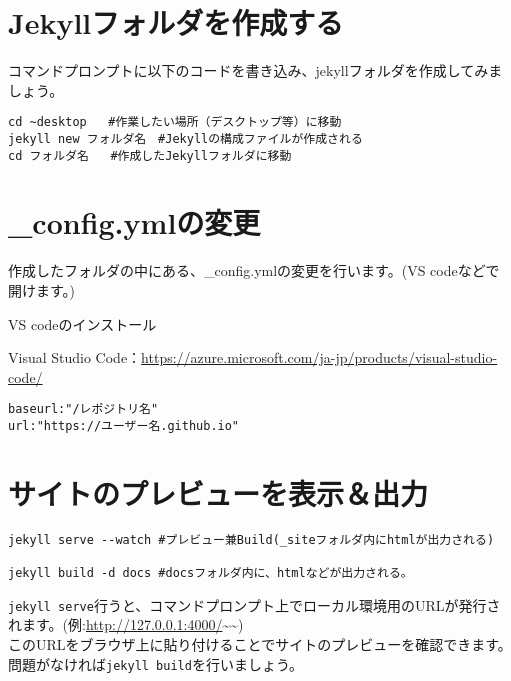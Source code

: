 \documentclass[
]{book}
\begin{document}
\hypertarget{jekyllux30d5ux30a9ux30ebux30c0ux3092ux4f5cux6210ux3059ux308b}{%
\section{Jekyllフォルダを作成する}\label{jekyllux30d5ux30a9ux30ebux30c0ux3092ux4f5cux6210ux3059ux308b}}

コマンドプロンプトに以下のコードを書き込み、jekyllフォルダを作成してみましょう。

\begin{verbatim}
cd ~desktop   #作業したい場所（デスクトップ等）に移動
jekyll new フォルダ名　#Jekyllの構成ファイルが作成される
cd フォルダ名   #作成したJekyllフォルダに移動
\end{verbatim}

\hypertarget{config.ymlux306eux5909ux66f4}{%
\section{\_config.ymlの変更}\label{config.ymlux306eux5909ux66f4}}

作成したフォルダの中にある、\_config.ymlの変更を行います。(VS codeなどで開けます。)

VS codeのインストール

Visual Studio Code：\url{https://azure.microsoft.com/ja-jp/products/visual-studio-code/}

\begin{verbatim}
baseurl:"/レポジトリ名"
url:"https://ユーザー名.github.io"
\end{verbatim}

\hypertarget{ux30b5ux30a4ux30c8ux306eux30d7ux30ecux30d3ux30e5ux30fcux3092ux8868ux793aux51faux529b}{%
\section{サイトのプレビューを表示＆出力}\label{ux30b5ux30a4ux30c8ux306eux30d7ux30ecux30d3ux30e5ux30fcux3092ux8868ux793aux51faux529b}}

\begin{verbatim}
jekyll serve --watch #プレビュー兼Build(_siteフォルダ内にhtmlが出力される)
 
jekyll build -d docs #docsフォルダ内に、htmlなどが出力される。
\end{verbatim}

\texttt{jekyll\ serve}行うと、コマンドプロンプト上でローカル環境用のURLが発行されます。(例:\url{http://127.0.0.1:4000/}\textasciitilde\textasciitilde)\\
このURLをブラウザ上に貼り付けることでサイトのプレビューを確認できます。問題がなければ\texttt{jekyll\ build}を行いましょう。　　
\end{document}
